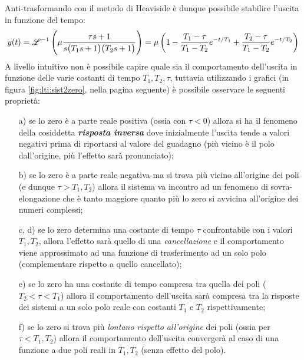 			Anti-trasformando con il metodo di Heaviside è dunque possibile stabilire l'uscita in funzione del tempo:
			\[ y(t) = \mathscr {L}^{-1} \left( \mu \frac{\tau s + 1}{s\big(T_1s +1\big)\big(T_2s+1\big)} \right) = \mu \left( 1 - \frac{T_1-\tau}{T_1-T_2} e^{-t/T_1} + \frac{T_2-\tau}{T_1-T_2}e^{-t/T_2} \right) \]
			A livello intuitivo non è possibile capire quale sia il comportamento dell'uscita in funzione delle varie costanti di tempo $T_1,T_2,\tau$, tuttavia utilizzando i grafici (in figura \ref{fig:lti:sist2zero}, nella pagina seguente) è possibile osservare le seguenti proprietà:
			\begin{itemize}
				\item[a)] se lo zero è a parte reale positiva (ossia con $\tau <0$) allora si ha il fenomeno della cosiddetta \textbf{\textit{risposta inversa}} dove inizialmente l'uscita tende a valori negativi prima di riportarsi al valore del guadagno (più vicino è il polo dall'origine, più l'effetto sarà pronunciato);
				
				\item[b)] se lo zero è a parte reale negativa ma si trova più vicino all'origine dei poli (e dunque $\tau > T_1,T_2$) allora il sistema va incontro ad un fenomeno di sovra-elongazione che è tanto maggiore quanto più lo zero si avvicina all'origine dei numeri complessi;
				
				\item[c, d)] se lo zero determina una costante di tempo $\tau$ confrontabile con i valori $T_1,T_2$, allora l'effetto sarà quello di una \textit{cancellazione} e il comportamento viene approssimato ad una funzione di trasferimento ad un solo polo (complementare rispetto a quello cancellato);
				
				\item[e)] se lo zero ha una costante di tempo compresa tra quella dei poli ($T_2 < \tau < T_1$) allora il comportamento dell'uscita sarà compresa tra la risposte dei sistemi a un solo polo reale con costanti $T_1$ e $T_2$ rispettivamente;
				
				\item[f)] se lo zero si trova più \textit{lontano rispetto all'origine} dei poli (ossia per $\tau < T_1,T_2$) allora il comportamento dell'uscita convergerà al caso di una funzione a due poli reali in $T_1,T_2$ (senza effetto del polo).
				
			\end{itemize}
			
